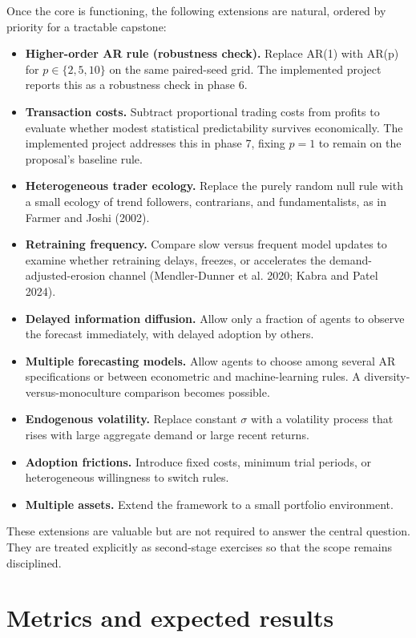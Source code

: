 \documentclass[11pt]{article}
\begin{document}
Once the core is functioning, the following extensions are natural, ordered by priority for a tractable capstone:

\begin{itemize}[itemsep=0.2em]
  \item \textbf{Higher-order AR rule (robustness check).} Replace AR(1) with AR(p) for $p \in \{2, 5, 10\}$ on the same paired-seed grid. The implemented project reports this as a robustness check in phase 6.
  \item \textbf{Transaction costs.} Subtract proportional trading costs from profits to evaluate whether modest statistical predictability survives economically. The implemented project addresses this in phase 7, fixing $p = 1$ to remain on the proposal's baseline rule.
  \item \textbf{Heterogeneous trader ecology.} Replace the purely random null rule with a small ecology of trend followers, contrarians, and fundamentalists, as in Farmer and Joshi (2002).
  \item \textbf{Retraining frequency.} Compare slow versus frequent model updates to examine whether retraining delays, freezes, or accelerates the demand-adjusted-erosion channel (Mendler-Dunner et al. 2020; Kabra and Patel 2024).
  \item \textbf{Delayed information diffusion.} Allow only a fraction of agents to observe the forecast immediately, with delayed adoption by others.
  \item \textbf{Multiple forecasting models.} Allow agents to choose among several AR specifications or between econometric and machine-learning rules. A diversity-versus-monoculture comparison becomes possible.
  \item \textbf{Endogenous volatility.} Replace constant $\sigma$ with a volatility process that rises with large aggregate demand or large recent returns.
  \item \textbf{Adoption frictions.} Introduce fixed costs, minimum trial periods, or heterogeneous willingness to switch rules.
  \item \textbf{Multiple assets.} Extend the framework to a small portfolio environment.
\end{itemize}

These extensions are valuable but are not required to answer the central question. They are treated explicitly as second-stage exercises so that the scope remains disciplined.


\section{Metrics and expected results}
\end{document}
